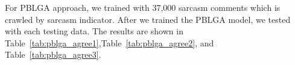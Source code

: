 \documentclass[12pt,a4paper]{report}
\theoremstyle{definition}
\begin{document}
\begin{CJK}{UTF8}{bsmi}
        \par For PBLGA approach, we trained with 37,000 sarcasm comments which is crawled by sarcasm indicator.
        After we trained the PBLGA model, we tested with each testing data. 
        The results are shown in Table~\ref{tab:pblga_agree1},Table~\ref{tab:pblga_agree2}, and Table~\ref{tab:pblga_agree3}.
    

        
        
        
        
        
        
        
        

\end{CJK}
\end{document}
